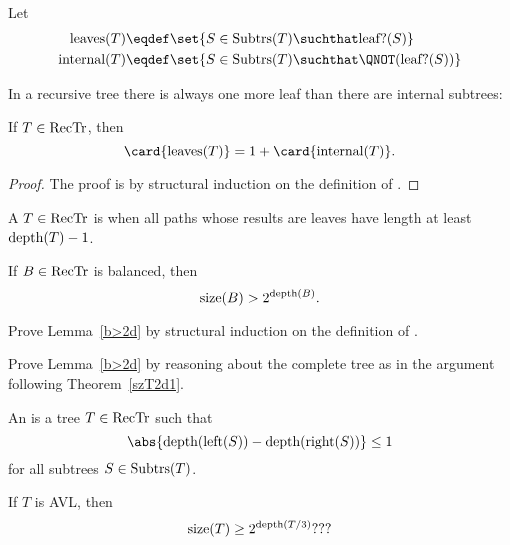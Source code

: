 Let
\begin{align*}
\text{leaves}(T)   & \eqdef \set{S \in \subbrn{T} \suchthat \leafp{(S)}}\\
\text{internal}(T) & \eqdef \set{S \in \subbrn{T} \suchthat \QNOT(\leafp{(S)})}\\
\end{align*}

In a recursive tree there is always one more leaf than there are
internal subtrees:

\begin{lemma}\label{}
If $T \in \text{RecTr}$, then
\[
\card{\text{leaves}(T)} = 1 + \card{\text{internal}(T)}.
\]
\end{lemma}

\begin{proof}
The proof is by structural induction on the definition of \rectr.

\end{proof} 

A $T \in \text{RecTr}$ is  when all paths whose
results are leaves have length at least $\text{depth}(T) -1$.

\begin{lemma}\label{b>2d}
If $B \in \text{RecTr}$ is balanced, then
\[
\text{size}(B) > 2^{\text{depth}(B)}.
\]
\end{lemma}

\begin{problem}
Prove Lemma~\ref{b>2d} by structural induction on the definition of \rectr.

\begin{solution}
\end{solution}
\end{problem}

\begin{problem}
Prove Lemma~\ref{b>2d} by reasoning about the complete tree as in the
argument following Theorem~\ref{szT2d1}.

\begin{solution}
\end{solution}
\end{problem}

An  is a tree $T\in \text{RecTr}$ such that
\[
\abs{\trdpth{\leftsub{(S)}} - \trdpth{\rightsub{(S)}}} \leq 1
\]
for all subtrees $S \in \text{Subtrs}(T)$.

\begin{lemma}\label{}
If $T$ is AVL, then
\[
\text{size}(T) \geq 2^{\text{depth}(T/3)}???
\]
\end{lemma}

